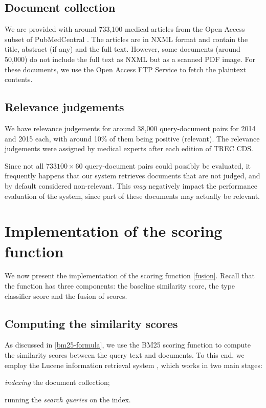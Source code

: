 \subsection{Document collection}
We are provided with around 733,100 medical articles from the Open Access subset of PubMedCentral \cite{oa}. The articles are in NXML format
and contain the title, abstract (if any) and the full text. However, some documents (around 50,000) do not include the full text
as NXML but as a scanned PDF image. For these documents, we use the Open Access FTP Service \cite{oa-ftp} to fetch the plaintext contents.

\subsection{Relevance judgements}\label{qrels}
We have relevance judgements for around 38,000 query-document pairs for 2014 and 2015 each, with around 10\% of them
being positive (relevant). The relevance judgements were assigned by medical experts after each edition of TREC CDS.

Since not all $733100\times 60$ query-document pairs could possibly be evaluated, it frequently happens that our system retrieves documents
that are not judged, and by default considered non-relevant. This \emph{may} negatively impact the performance evaluation of
the system, since part of these documents may actually be relevant.

\section{Implementation of the scoring function}
We now present the implementation of the scoring function \ref{fusion}. Recall that the function has three components:
the baseline similarity score, the type classifier score and the fusion of scores.

\subsection{Computing the similarity scores}\label{sim-impl}
As discussed in \ref{bm25-formula}, we use the \textsf{BM25} scoring function to compute the similarity scores between the query
text and documents. To this end, we employ the Lucene information retrieval system \cite{lucene}, which works in two main stages:
\begin{enumerate*}[label=\arabic*)]
 \item \emph{indexing} the document collection;
 \item running the \emph{search queries} on the index. 
\end{enumerate*}

